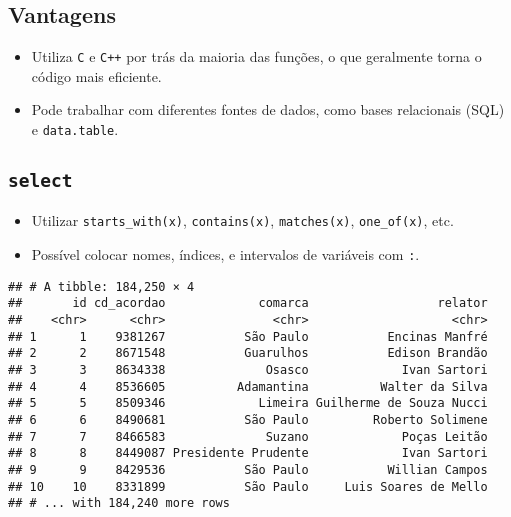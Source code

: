 \documentclass[]{book}
\newenvironment{Shaded}{\begin{snugshade}}{\end{snugshade}}
\newcommand{\KeywordTok}[1]{\textcolor[rgb]{0.13,0.29,0.53}{\textbf{{#1}}}}
\newcommand{\DataTypeTok}[1]{\textcolor[rgb]{0.13,0.29,0.53}{{#1}}}
\newcommand{\StringTok}[1]{\textcolor[rgb]{0.31,0.60,0.02}{{#1}}}
\newcommand{\NormalTok}[1]{{#1}}
\providecommand{\tightlist}{%
  \setlength{\itemsep}{0pt}\setlength{\parskip}{0pt}}
\begin{document}
\subsection{Vantagens}\label{vantagens}

\begin{itemize}
\tightlist
\item
  Utiliza \texttt{C} e \texttt{C++} por trás da maioria das funções, o
  que geralmente torna o código mais eficiente.
\item
  Pode trabalhar com diferentes fontes de dados, como bases relacionais
  (SQL) e \texttt{data.table}.
\end{itemize}

\subsection{\texorpdfstring{\texttt{select}}{select}}\label{select}

\begin{itemize}
\tightlist
\item
  Utilizar \texttt{starts\_with(x)}, \texttt{contains(x)},
  \texttt{matches(x)}, \texttt{one\_of(x)}, etc.
\item
  Possível colocar nomes, índices, e intervalos de variáveis com
  \texttt{:}.
\end{itemize}

\begin{Shaded}
\end{Shaded}

\begin{verbatim}
## # A tibble: 184,250 × 4
##       id cd_acordao             comarca                  relator
##    <chr>      <chr>               <chr>                    <chr>
## 1      1    9381267           São Paulo           Encinas Manfré
## 2      2    8671548           Guarulhos           Edison Brandão
## 3      3    8634338              Osasco             Ivan Sartori
## 4      4    8536605          Adamantina          Walter da Silva
## 5      5    8509346             Limeira Guilherme de Souza Nucci
## 6      6    8490681           São Paulo         Roberto Solimene
## 7      7    8466583              Suzano             Poças Leitão
## 8      8    8449087 Presidente Prudente             Ivan Sartori
## 9      9    8429536           São Paulo           Willian Campos
## 10    10    8331899           São Paulo     Luis Soares de Mello
## # ... with 184,240 more rows
\end{verbatim}
\end{document}
